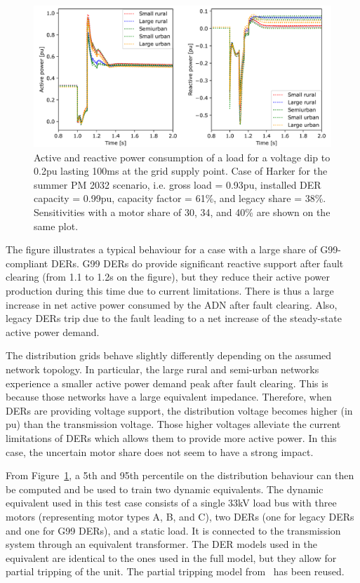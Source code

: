 \begin{figure}
    \centering
    \includegraphics[width=\linewidth]{Figs/CIGRE_equiv.png}
    \caption{Active and reactive power consumption of a load for a voltage dip to 0.2pu lasting 100ms at the grid supply point. Case of Harker for the summer PM 2032 scenario, i.e. gross load = 0.93pu, installed DER capacity = 0.99pu, capacity factor = 61\%, and legacy share = 38\%. Sensitivities with a motor share of 30, 34, and 40\% are shown on the same plot.}
    \label{fig:CIGRE_equiv}
\end{figure}


The figure illustrates a typical behaviour for a case with a large share of G99-compliant DERs. G99 DERs do provide significant reactive support after fault clearing (from 1.1 to 1.2s on the figure), but they reduce their active power production during this time due to current limitations. There is thus a large increase in net active power consumed by the ADN after fault clearing. Also, legacy DERs trip due to the fault leading to a net increase of the steady-state active power demand.

The distribution grids behave slightly differently depending on the assumed network topology. In particular, the large rural and semi-urban networks experience a smaller active power demand peak after fault clearing. This is because those networks have a large equivalent impedance. Therefore, when DERs are providing voltage support, the distribution voltage becomes higher (in pu) than the transmission voltage. Those higher voltages alleviate the current limitations of DERs which allows them to provide more active power. In this case, the uncertain motor share does not seem to have a strong impact.

From Figure~\ref{fig:CIGRE_equiv}, a 5th and 95th percentile on the distribution behaviour can then be computed and be used to train two dynamic equivalents. The dynamic equivalent used in this test case consists of a single 33kV load bus with three motors (representing motor types A, B, and C), two DERs (one for legacy DERs and one for G99 DERs), and a static load. It is connected to the transmission system through an equivalent transformer. The DER models used in the equivalent are identical to the ones used in the full model, but they allow for partial tripping of the unit. The partial tripping model from~\cite{ChaspierreThesis} has been reused.


